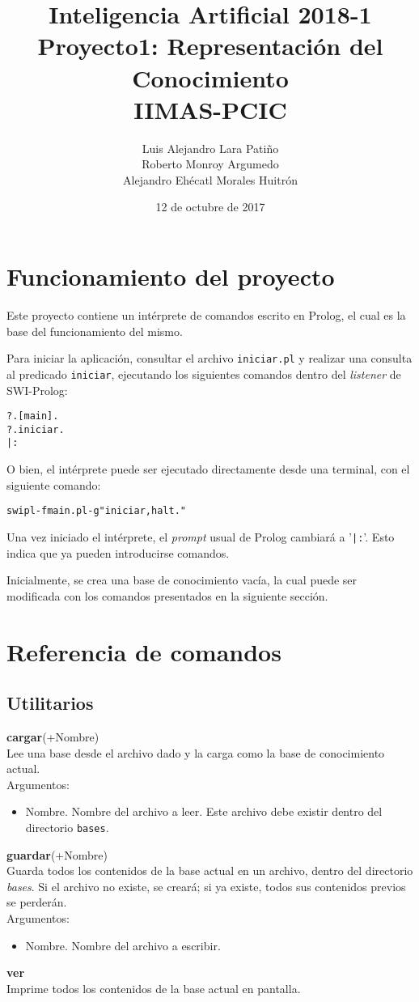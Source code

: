 \documentclass[11pt]{article}
\title{Inteligencia Artificial 2018-1 \\ Proyecto1: Representación del Conocimiento\\
\small{IIMAS-PCIC}}
\author{Luis Alejandro Lara Patiño\\Roberto Monroy Argumedo\\
Alejandro Ehécatl Morales Huitrón}
\date{12 de octubre de 2017}
\newcommand{\bt}{\begin{alltt}}
\newcommand{\et}{\end{alltt}}
\newcommand{\comando}[2]{
    \textbf{#1}(#2)\\
}
\newenvironment{args}{
    Argumentos:
    \begin{itemize}
}{
    \end{itemize}
    \bigskip
}
\begin{document}
\maketitle

\section{Funcionamiento del proyecto}

Este proyecto contiene un intérprete de comandos escrito en Prolog, el cual es la base del funcionamiento del mismo.

Para iniciar la aplicación, consultar el archivo \texttt{iniciar.pl} y realizar una consulta al predicado \texttt{iniciar}, ejecutando los siguientes comandos dentro del \textit{listener} de SWI-Prolog:

\bt
?. [main].
?. iniciar.
|:
\et

O bien, el intérprete puede ser ejecutado directamente desde una terminal, con el siguiente comando:

\bt
swipl -f main.pl -g "iniciar, halt."
\et

Una vez iniciado el intérprete, el \textit{prompt} usual de Prolog cambiará a '\texttt{|:}'. Esto indica que ya pueden introducirse comandos.

Inicialmente, se crea una base de conocimiento vacía, la cual puede ser modificada con los comandos presentados en la siguiente sección.

\section{Referencia de comandos}

\subsection{Utilitarios}

\comando{cargar}{+Nombre}
Lee una base desde el archivo dado y la carga como la base de conocimiento actual.\\
\begin{args}
    \item Nombre. Nombre del archivo a leer. Este archivo debe existir dentro del directorio \texttt{bases}.
\end{args}

\comando{guardar}{+Nombre}
Guarda todos los contenidos de la base actual en un archivo, dentro del directorio \textit{bases}. Si el archivo no existe, se creará; si ya existe, todos sus contenidos previos se perderán.\\
\begin{args}
    \item Nombre. Nombre del archivo a escribir.
\end{args}

\textbf{ver}\\
Imprime todos los contenidos de la base actual en pantalla.
\end{document}
